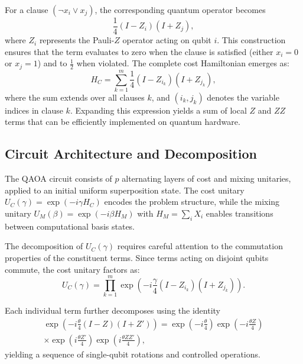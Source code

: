 \documentclass[%
 reprint,
 amsmath,amssymb,
 aps,
]{revtex4-2}
\begin{document}
For a clause $(\neg x_i \vee x_j)$, the corresponding quantum operator becomes 
\begin{equation}
\frac{1}{4}(I - Z_i)(I + Z_j),
\label{eq:clause_operator}
\end{equation}
where $Z_i$ represents the Pauli-$Z$ operator acting on qubit $i$. This construction ensures that the term evaluates to zero when the clause is satisfied (either $x_i = 0$ or $x_j = 1$) and to $\frac{1}{2}$ when violated. The complete cost Hamiltonian emerges as:
\begin{equation}
H_C = \sum_{k=1}^{m} \frac{1}{4}(I - Z_{i_k})(I + Z_{j_k}),
\label{eq:cost_hamiltonian}
\end{equation}
where the sum extends over all clauses $k$, and $(i_k, j_k)$ denotes the variable indices in clause $k$. Expanding this expression yields a sum of local $Z$ and $ZZ$ terms that can be efficiently implemented on quantum hardware.

\subsection{Circuit Architecture and Decomposition}
\label{subsec:architecture}

The QAOA circuit consists of $p$ alternating layers of cost and mixing unitaries, applied to an initial uniform superposition state. The cost unitary $U_C(\gamma) = \exp(-i\gamma H_C)$ encodes the problem structure, while the mixing unitary $U_M(\beta) = \exp(-i\beta H_M)$ with $H_M = \sum_i X_i$ enables transitions between computational basis states.

The decomposition of $U_C(\gamma)$ requires careful attention to the commutation properties of the constituent terms. Since terms acting on disjoint qubits commute, the cost unitary factors as:
\begin{equation}
U_C(\gamma) = \prod_{k=1}^{m} \exp\left(-i\frac{\gamma}{4}(I - Z_{i_k})(I + Z_{j_k})\right).
\label{eq:cost_unitary_factorization}
\end{equation}

Each individual term further decomposes using the identity 
\begin{multline}
\exp\left(-i\frac{\theta}{4}(I - Z)(I + Z')\right) = \exp\left(-i\frac{\theta}{4}\right)\exp\left(-i\frac{\theta Z}{4}\right) \\
\times \exp\left(i\frac{\theta Z'}{4}\right)\exp\left(i\frac{\theta ZZ'}{4}\right),
\label{eq:unitary_decomposition}
\end{multline}
yielding a sequence of single-qubit rotations and controlled operations.
\end{document}
